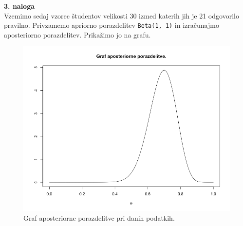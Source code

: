 \documentclass[a4paper,11pt]{article}
\begin{document}

\noindent
\textbf{3. naloga}
\\
Vzemimo sedaj vzorec študentov velikosti 30 izmed katerih jih je 21 odgovorilo pravilno. Privzamemo apriorno porazdelitev \texttt{Beta(1, 1)} in izračunajmo aposteriorno porazdelitev.
Prikažimo jo na grafu.

\begin{figure}[ht!]
    \centering
    \includegraphics[width = 120mm]{Slike/3.png}
    \caption{Graf aposteriorne porazdelitve pri danih podatkih.}
\end{figure}

\end{document}
